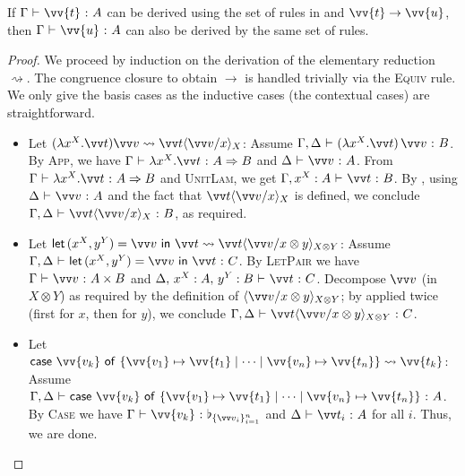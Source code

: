\documentclass[runningheads,orivec,envcountsame,envcountsect]{llncs}
\newcommand\lra{\longrightarrow}
\newcommand\ansubst[2]{\ensuremath{\langle #1 \rangle_{#2}}}
\def\Pair#1#2{(#1,#2)} %
\def\Lam#1#2#3{\lambda#1^{#2}{.}#3} %
\def\letkeyword{\mathsf{let}}
\def\inkeyword{\mathsf{in}}
\def\LetP#1#2#3#4#5#6{\letkeyword\,\Pair{#1^{#2}}{#3^{#4}}=#5~\inkeyword~#6}
\def\gencase#1#2#3#4#5{\ensuremath{\mathsf{case}~#1~\mathsf{of}~\{#2\mapsto #4 \mid \dotsb \mid #3\mapsto #5\}}}
\def\lraneq{\rightsquigarrow}
\def\Arr{\Rightarrow}
\def\TYP#1#2#3{#1~{\vdash}~#2~{:}~#3}
\newcommand\basis[1]{\ensuremath{\flat_{#1}}}
\begin{document}
\begin{restatetheorem}
  If $\TYP{\Gamma}{\vv{t}}{A}$ can be derived using the set of rules in
   and $\vv{t}\to\vv{u}$, then
  $\TYP{\Gamma}{\vv{u}}{A}$ can also be derived by the same set of rules.
\end{restatetheorem}
\begin{proof}
  We proceed by induction on the derivation of the elementary reduction
  $\lraneq$. The congruence closure to obtain $\lra$ is handled trivially via
  the \textsc{Equiv} rule. We only give the basis cases as the inductive cases (the contextual cases) are straightforward.
  \begin{itemize}
    \item Let $(\Lam{x}{X}{\vv t})\vv v \lraneq \vv t\ansubst{\vv v/x}{X}$:
      Assume $\TYP{\Gamma,\Delta}{(\Lam{x}{X}{\vv t})\,\vv v}{B}$. By
      \textsc{App}, we have $\TYP{\Gamma}{\Lam{x}{X}{\vv t}}{A\Arr B}$ and
      $\TYP{\Delta}{\vv v}{A}$.  From $\TYP{\Gamma}{\Lam{x}{X}{\vv t}}{A\Arr B}$
      and \textsc{UnitLam}, we get $\TYP{\Gamma,x^{X}:A}{\vv t}{B}$. By
      ,
      using $\TYP{\Delta}{\vv v}{A}$ and the fact that $\vv t\ansubst{\vv
      v/x}{X}$ is defined, we conclude $\TYP{\Gamma,\Delta}{\vv t\ansubst{\vv
      v/x}{X}}{B}$, as required.

    \item Let $\LetP{x}{X}{y}{Y}{\vv v}{\vv t} \lraneq \vv t\ansubst{\vv
      v/x\otimes y}{X\otimes Y}$: Assume
      $\TYP{\Gamma,\Delta}{\LetP{x}{X}{y}{Y}{\vv v}{\vv t}}{C}$.  By
      \textsc{LetPair} we have $\TYP{\Gamma}{\vv v}{A\times B}$ and
      $\TYP{\Delta,\,x^{X}:A,\,y^{Y}:B}{\vv t}{C}$.  Decompose $\vv v$ (in
      $X\otimes Y$) as required by the definition of $\ansubst{\vv v/x\otimes
      y}{X\otimes Y}$; by 
      applied twice
      (first for $x$, then for $y$), we conclude $\TYP{\Gamma,\Delta}{\vv
      t\ansubst{\vv v/x\otimes y}{X\otimes Y}}{C}$.

    \item Let $\gencase{\vv{v_k}}{\vv{v_1}}{\vv{v_n}}{\vv{t_1}}{\vv{t_n}}
      \lraneq \vv{t_k}$: Assume
      $\TYP{\Gamma,\Delta}{\gencase{\vv{v_k}}{\vv{v_1}}{\vv{v_n}}{\vv{t_1}}{\vv{t_n}}}{A}$.
      By \textsc{Case} we have $\TYP{\Gamma}{{\vv{v_k}}}{\basis{\{\vv
      v_i\}_{i=1}^n}}$ and $\TYP{\Delta}{\vv t_i}{A}$ for all $i$.  Thus, we are
      done.


\end{itemize}
\end{proof}
\end{document}

